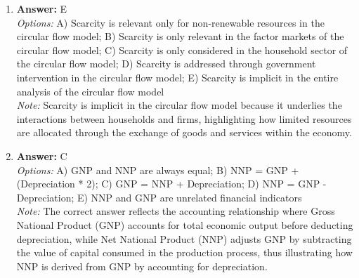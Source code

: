 \documentclass[12pt]{article}
\begin{document}
\begin{enumerate}[label=\arabic*.]
\item \textbf{Answer:} E
\\ \textit{Options:} A) Scarcity is relevant only for non-renewable resources in the circular flow model; B) Scarcity is only relevant in the factor markets of the circular flow model; C) Scarcity is only considered in the household sector of the circular flow model; D) Scarcity is addressed through government intervention in the circular flow model; E) Scarcity is implicit in the entire analysis of the circular flow model
\\ \textit{Note:} Scarcity is implicit in the circular flow model because it underlies the interactions between households and firms, highlighting how limited resources are allocated through the exchange of goods and services within the economy.
\item \textbf{Answer:} C
\\ \textit{Options:} A) GNP and NNP are always equal; B) NNP = GNP + (Depreciation * 2); C) GNP = NNP + Depreciation; D) NNP = GNP - Depreciation; E) NNP and GNP are unrelated financial indicators
\\ \textit{Note:} The correct answer reflects the accounting relationship where Gross National Product (GNP) accounts for total economic output before deducting depreciation, while Net National Product (NNP) adjusts GNP by subtracting the value of capital consumed in the production process, thus illustrating how NNP is derived from GNP by accounting for depreciation.
\end{enumerate}
\end{document}
